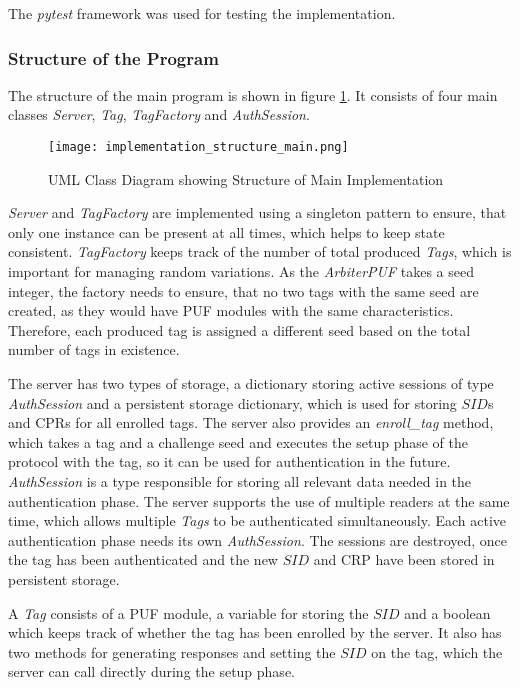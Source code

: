 The \emph{pytest} framework was used for testing the implementation.

\subsubsection{Structure of the Program}

The structure of the main program is shown in figure \ref{fig:implementation_structure_main}.
It consists of four main classes \emph{Server}, \emph{Tag}, \emph{TagFactory} and \emph{AuthSession}.

\begin{figure}[H]
    \centering
    \caption{UML Class Diagram showing Structure of Main Implementation}
    \label{fig:implementation_structure_main}
    \texttt{[image: implementation\_structure\_main.png]}
\end{figure}

\emph{Server} and \emph{TagFactory} are implemented using a singleton pattern to ensure, that only one instance
can be present at all times, which helps to keep state consistent.
\emph{TagFactory} keeps track of the number of total produced \emph{Tags}, which is important for managing random variations.
As the \emph{ArbiterPUF} takes a seed integer, the factory needs to ensure, that no two tags with the same
seed are created, as they would have PUF modules with the same characteristics.
Therefore, each produced tag is assigned a different seed based on the total number of tags in existence.

The server has two types of storage, a dictionary storing active sessions of type \emph{AuthSession} and
a persistent storage dictionary, which is used for storing $SID$s and CPRs for all enrolled tags.
The server also provides an \emph{enroll\_tag} method, which takes a tag and a challenge seed and
executes the setup phase of the protocol with the tag, so it can be used for authentication in the future.
\emph{AuthSession} is a type responsible for storing all relevant data needed in the authentication phase.
The server supports the use of multiple readers at the same time, which allows multiple \emph{Tags} to be
authenticated simultaneously. Each active authentication phase needs its own \emph{AuthSession}.
The sessions are destroyed, once the tag has been authenticated and the new $SID$ and CRP have been stored
in persistent storage.

A \emph{Tag} consists of a PUF module, a variable for storing the $SID$ and a boolean which keeps track of
whether the tag has been enrolled by the server.
It also has two methods for generating responses and setting the $SID$ on the tag, which the server can call directly
during the setup phase.

